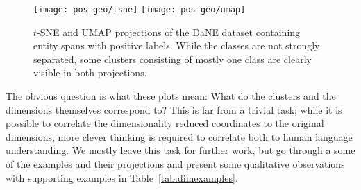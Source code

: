 \documentclass[main.tex]{subfiles}
\begin{document}
\begin{figure}[H]
    \centering
        \texttt{[image: pos-geo/tsne]}
        \texttt{[image: pos-geo/umap]}
    \caption{
        $t$-SNE and UMAP projections of the DaNE dataset containing entity spans with positive labels.
        While the classes are not strongly separated, some clusters consisting of mostly one class are clearly visible in both projections.
    }
    \label{fig:pos-tsne}
\end{figure}\noindent
The obvious question is what these plots mean: What do the clusters and the dimensions themselves correspond to?
This is far from a trivial task; while it is possible to correlate the dimensionality reduced coordinates to the original dimensions, more clever thinking is required to correlate both to human language understanding.
We mostly leave this task for further work, but go through a some of the examples and their projections and present some qualitative observations with supporting examples in Table~\ref{tab:dimexamples}.
\end{document}
